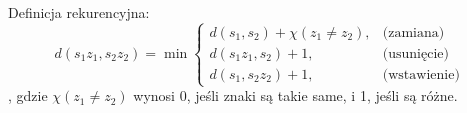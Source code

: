 Definicja rekurencyjna:
\[
    d(s_1z_1, s_2z_2) = \min 
    \begin{cases} 
        d(s_1, s_2) + \chi(z_1 \neq z_2), & \text{(zamiana)} \\ 
        d(s_1z_1, s_2) + 1, & \text{(usunięcie)} \\ 
        d(s_1, s_2z_2) + 1, & \text{(wstawienie)} 
    \end{cases}
\]
, gdzie \(\chi(z_1 \neq z_2)\) wynosi 0, jeśli znaki są takie same, i 1, jeśli są różne.